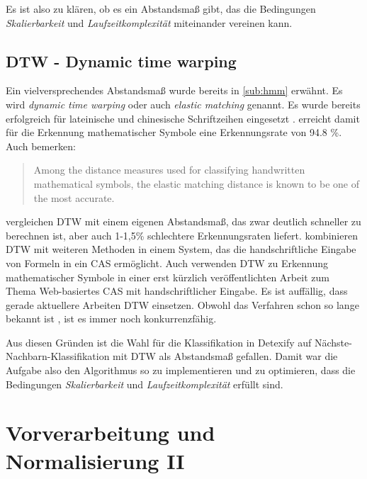 Es ist also zu klären, ob es ein Abstandsmaß gibt, das die Bedingungen \emph{Skalierbarkeit} und \emph{Laufzeitkomplexität} miteinander vereinen kann.

\subsection[DTW]{DTW - Dynamic time warping}

Ein vielversprechendes Abstandsmaß wurde bereits in \ref{sub:hmm} erwähnt. Es wird \emph{dynamic time warping} oder auch \emph{elastic matching} genannt. Es wurde bereits erfolgreich für lateinische und chinesische Schriftzeihen eingesetzt \cite{Tappert:1990p10302}. \citet{Xie:2007p11427} erreicht damit für die Erkennung mathematischer Symbole eine Erkennungsrate von 94.8 \%. Auch \citet{Golubitsky:2009p2433} bemerken:
\begin{quote}
  Among the distance measures used for classifying handwritten mathematical symbols, the elastic matching distance is known to be one of the most accurate.
\end{quote}

\citet{Golubitsky:2009p1842} vergleichen DTW mit einem eigenen Abstandsmaß, das zwar deutlich schneller zu berechnen ist, aber auch 1-1,5\% schlechtere Erkennungsraten liefert. \citet{Labahn:2008p10301} kombinieren DTW mit weiteren Methoden in einem System, das die handschriftliche Eingabe von Formeln in ein \ac{CAS} ermöglicht.
Auch \citet{Vuong:2010p10279} verwenden DTW %
zu Erkennung mathematischer Symbole in einer erst kürzlich veröffentlichten Arbeit zum Thema Web-basiertes CAS mit handschriftlicher Eingabe. Es ist auffällig, dass gerade aktuellere Arbeiten DTW einsetzen. Obwohl das Verfahren schon so lange bekannt ist \cite{Tappert:1982p10305}, ist es immer noch konkurrenzfähig.

Aus diesen Gründen ist die Wahl für die Klassifikation in Detexify auf Nächste-Nachbarn-Klassifikation mit DTW als Abstandsmaß gefallen. Damit war die Aufgabe also den Algorithmus so zu implementieren und zu optimieren, dass die Bedingungen \emph{Skalierbarkeit} und \emph{Laufzeitkomplexität} erfüllt sind.

\section{Vorverarbeitung und Normalisierung II}
\label{sec:vorverarbeitung2}

